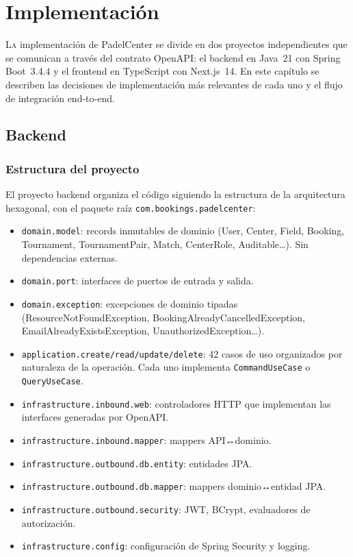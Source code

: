 \chapter{Implementación}
\label{chap:implementacion}

\lettrine{L}{a} implementación de PadelCenter se divide en dos proyectos
independientes que se comunican a través del contrato OpenAPI: el backend
en Java~21 con Spring Boot~3.4.4 y el frontend en TypeScript con Next.js~14.
En este capítulo se describen las decisiones de implementación más relevantes
de cada uno y el flujo de integración end-to-end.

\section{Backend}
\label{sec:implementacion_backend}

\subsection{Estructura del proyecto}

El proyecto backend organiza el código siguiendo la estructura de la arquitectura
hexagonal, con el paquete raíz \texttt{com.bookings.padelcenter}:

\begin{itemize}
  \item \texttt{domain.model}: records inmutables de dominio (User, Center, Field,
    Booking, Tournament, TournamentPair, Match, CenterRole, Auditable\ldots).
    Sin dependencias externas.
  \item \texttt{domain.port}: interfaces de puertos de entrada y salida.
  \item \texttt{domain.exception}: excepciones de dominio tipadas
    (ResourceNotFoundException, BookingAlreadyCancelledException,
    EmailAlreadyExistsException, UnauthorizedException\ldots).
  \item \texttt{application.create/read/update/delete}: 42 casos de uso
    organizados por naturaleza de la operación. Cada uno implementa
    \texttt{CommandUseCase} o \texttt{QueryUseCase}.
  \item \texttt{infrastructure.inbound.web}: controladores HTTP que implementan
    las interfaces generadas por OpenAPI.
  \item \texttt{infrastructure.inbound.mapper}: mappers API↔dominio.
  \item \texttt{infra\-structure.out\-bound.db.entity}: entidades JPA.
  \item \texttt{infra\-structure.out\-bound.db.mapper}: mappers dominio↔entidad JPA.
  \item \texttt{infra\-structure.out\-bound.security}: JWT, BCrypt, evaluadores
    de autorización.
  \item \texttt{infrastructure.config}: configuración de Spring Security y logging.
\end{itemize}

